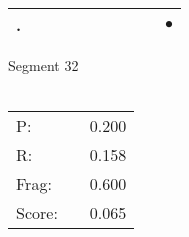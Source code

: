 \documentclass[landscape]{article}
\newcommand{\ssp}{\hspace{2pt}}
\newcommand{\mex}{\cellcolor{g}$\bullet$}
\begin{document}
\begin{tabular}{|l|p{10pt}|p{10pt}|p{10pt}|p{10pt}|p{10pt}|p{10pt}|p{10pt}|p{10pt}|p{10pt}|}
\hline
\ssp \cellcolor{ref8}. \ssp&\hspace{2pt}&\hspace{2pt}&\hspace{2pt}&\hspace{2pt}&\hspace{2pt}&\hspace{2pt}&\hspace{2pt}&\hspace{2pt}&\hspace{2pt}\mex\\
\hline
\end{tabular}

\vspace{6pt}
\noindent Segment 32\\\\
\noindent\begin{tabular}{lm{12pt}r}
\hline
P:&&0.200\\
R:&&0.158\\
Frag:&&0.600\\
Score:&&0.065\\
\end{tabular}

\newpage
\end{document}
